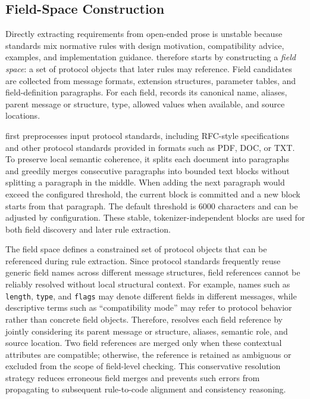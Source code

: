 \subsection{Field-Space Construction}
\label{sec:fieldspace}

Directly extracting requirements from open-ended prose is unstable because
standards mix normative rules with design motivation, compatibility advice,
examples, and implementation guidance. \tool{} therefore starts by constructing
a \emph{field space}: a set of protocol objects that later rules may reference.
Field candidates are collected from message formats, extension structures,
parameter tables, and field-definition paragraphs. For each field, \tool{}
records its canonical name, aliases, parent message or structure, type,
allowed values when available, and source locations.

\tool{} first preprocesses input protocol standards, including RFC-style specifications 
and other protocol standards provided in formats such as PDF, DOC, or TXT.  To preserve 
local semantic coherence, it splits each document into paragraphs and greedily merges 
consecutive paragraphs into bounded text blocks without splitting a paragraph in the 
middle. When adding the next paragraph would exceed the configured threshold, the current 
block is committed and a new block starts from that paragraph. The default threshold is 
6000 characters and can be adjusted by configuration. These stable, tokenizer-independent 
blocks are used for both field discovery and later rule extraction.

The field space defines a constrained set of protocol objects that can be
referenced during rule extraction. Since protocol standards frequently reuse
generic field names across different message structures, field references
cannot be reliably resolved without local structural context. For example,
names such as \texttt{length}, \texttt{type}, and \texttt{flags} may denote
different fields in different messages, while descriptive terms such as
``compatibility mode'' may refer to protocol behavior rather than concrete
field objects. Therefore, \tool{} resolves each field reference by jointly
considering its parent message or structure, aliases, semantic role, and source
location. Two field references are merged only when these contextual attributes
are compatible; otherwise, the reference is retained as ambiguous or excluded
from the scope of field-level checking. This conservative resolution strategy
reduces erroneous field merges and prevents such errors from propagating to
subsequent rule-to-code alignment and consistency reasoning.

